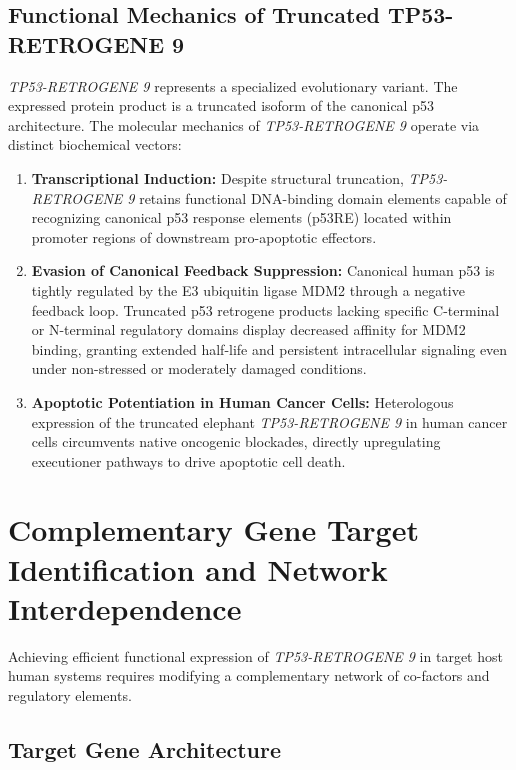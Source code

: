 \documentclass[12pt]{article}
\begin{document}
\subsection{Functional Mechanics of Truncated TP53-RETROGENE 9}

\textit{TP53-RETROGENE 9} represents a specialized evolutionary variant. The expressed protein product is a truncated isoform of the canonical p53 architecture. The molecular mechanics of \textit{TP53-RETROGENE 9} operate via distinct biochemical vectors:

\begin{enumerate}
    \item \textbf{Transcriptional Induction:} Despite structural truncation, \textit{TP53-RETROGENE 9} retains functional DNA-binding domain elements capable of recognizing canonical p53 response elements (p53RE) located within promoter regions of downstream pro-apoptotic effectors.
    \item \textbf{Evasion of Canonical Feedback Suppression:} Canonical human p53 is tightly regulated by the E3 ubiquitin ligase MDM2 through a negative feedback loop. Truncated p53 retrogene products lacking specific C-terminal or N-terminal regulatory domains display decreased affinity for MDM2 binding, granting extended half-life and persistent intracellular signaling even under non-stressed or moderately damaged conditions.
    \item \textbf{Apoptotic Potentiation in Human Cancer Cells:} Heterologous expression of the truncated elephant \textit{TP53-RETROGENE 9} in human cancer cells circumvents native oncogenic blockades, directly upregulating executioner pathways to drive apoptotic cell death.
\end{enumerate}

\section{Complementary Gene Target Identification and Network Interdependence}

Achieving efficient functional expression of \textit{TP53-RETROGENE 9} in target host human systems requires modifying a complementary network of co-factors and regulatory elements. 

\subsection{Target Gene Architecture}
\end{document}
